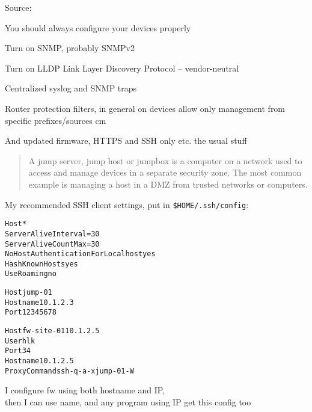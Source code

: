 \documentclass[Screen16to9,17pt]{foils}
\begin{document}
Source:\\{\footnotesize
{}}


\begin{slidelist}
\item You should always configure your devices properly
\item Turn on SNMP, probably SNMPv2
\item Turn on LLDP Link Layer Discovery Protocol -- vendor-neutral\\
{\small{}}
\item Centralized syslog and SNMP traps
\item Router protection filters, in general on devices allow only management from specific prefixes/sources
 cm
\item And updated firmware, HTTPS and SSH only etc. the usual stuff

\end{slidelist}


\begin{quote}
A jump server, jump host or jumpbox is a computer on a network used to access and manage devices in a separate security zone. The most common example is managing a host in a DMZ from trusted networks or computers.
\end{quote}




My recommended SSH client settings, put in \verb+$HOME/.ssh/config+:
\begin{alltt}\footnotesize
Host *
    ServerAliveInterval=30
    ServerAliveCountMax=30
    NoHostAuthenticationForLocalhost yes
    HashKnownHosts yes
    UseRoaming no

Host jump-01
  Hostname 10.1.2.3
  Port 12345678

Host fw-site-01 10.1.2.5
  User hlk
  Port 34
  Hostname 10.1.2.5
  ProxyCommand ssh -q -a -x jump-01 -W %h:%p
\end{alltt}

I configure fw using both hostname and IP,\\
then I can use name, and any program using IP get this config too
\end{document}
